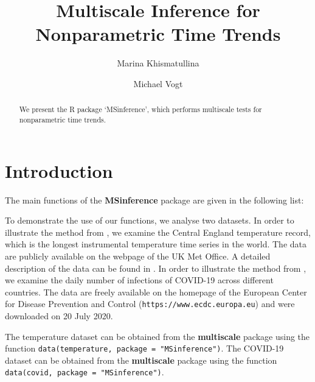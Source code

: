\documentclass[a4paper]{article}
\title{Multiscale Inference for Nonparametric Time Trends}
\author{Marina Khismatullina \and Michael Vogt}
\begin{document}


\maketitle

\begin{abstract}
We present the R package `MSinference', which performs multiscale tests for nonparametric time trends.
\end{abstract}

\tableofcontents

\section{Introduction}
The main functions of the \textbf{MSinference} package are given in
the following list:

To demonstrate the use of our functions, we analyse two datasets. In order to illustrate the method from \cite{KhismatullinaVogt2020}, we examine the Central England temperature record, which is the longest instrumental temperature time series in the world. The data are publicly available on the webpage of the UK Met Office. A detailed description of the data can be found in \cite{Parker1992}. In order to illustrate the method from \cite{KhismatullinaVogt2023}, we examine the daily number of infections of COVID-19 across different countries. The data are freely available on the homepage of the European Center for Disease Prevention and Control (\texttt{https://www.ecdc.europa.eu}) and were downloaded on 20 July 2020.

The temperature dataset can be obtained from the \textbf{multiscale} package using the function \verb|data(temperature, package = "MSinference")|. The COVID-19 dataset can be obtained from the \textbf{multiscale} package using the function \linebreak \verb|data(covid, package = "MSinference")|.
\end{document}
